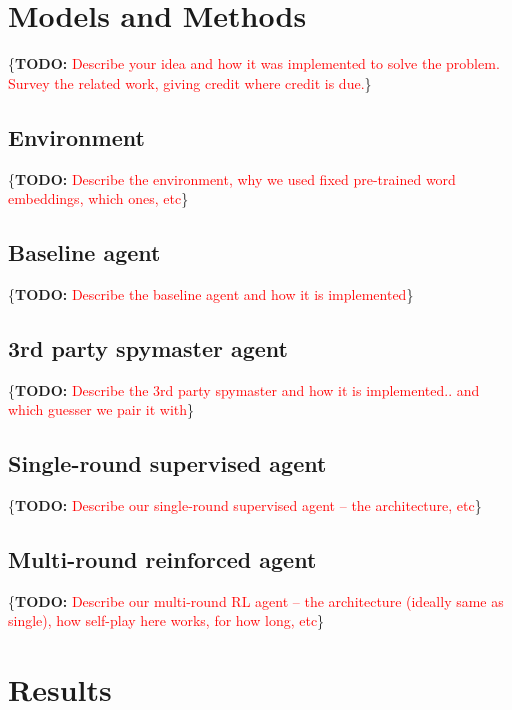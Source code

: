 \documentclass{article}
\newcommand{\TODO}[1]{\{\textbf{TODO: }\textcolor{red}{#1}\}}
\begin{document}
\section{Models and Methods}

\TODO{Describe your idea and how it was implemented to solve the problem. Survey the related work, giving credit where credit is due.}

\subsection{Environment}

\TODO{Describe the environment, why we used fixed pre-trained word embeddings, which ones, etc}

\subsection{Baseline agent}

\TODO{Describe the baseline agent and how it is implemented}

\subsection{3rd party spymaster agent}

\TODO{Describe the 3rd party spymaster and how it is implemented.. and which guesser we pair it with}

\subsection{Single-round supervised agent}\label{sec:single}

\TODO{Describe our single-round supervised agent -- the architecture, etc}

\subsection{Multi-round reinforced agent}\label{sec:multi}

\TODO{Describe our multi-round RL agent -- the architecture (ideally same as single), how self-play here works, for how long, etc}








\section{Results}
\end{document}
